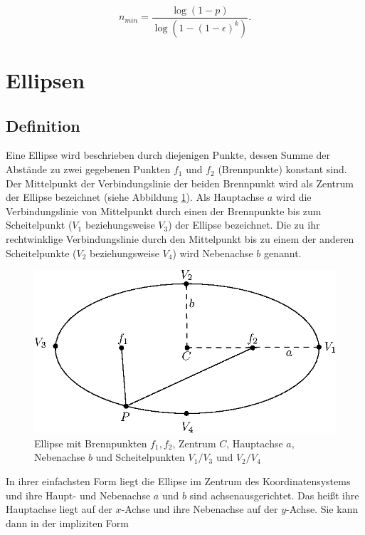 \begin{equation}
n_{min} = \frac{\log{\left(1-p\right)}}{\log{\left(1-\left(1-\epsilon\right)^k\right)}}.
\end{equation}


\section{Ellipsen}
\label{s:ellipse}
\subsection{Definition}
\label{s:ellipseGeneral}

\begin{definition}[Ellipse]
	Eine Ellipse wird beschrieben durch diejenigen Punkte, dessen Summe der Abstände zu zwei gegebenen Punkten $f_1$ und $f_2$ (Brennpunkte) konstant sind. Der Mittelpunkt der Verbindungslinie der beiden Brennpunkt wird als Zentrum der Ellipse bezeichnet (siehe Abbildung \ref{fig:ellipseDef}).
	Als Hauptachse $a$ wird die Verbindungslinie von Mittelpunkt durch einen der Brennpunkte bis zum Scheitelpunkt ($V_1$ beziehungsweise $V_3$) der Ellipse bezeichnet. Die zu ihr rechtwinklige Verbindungslinie durch den Mittelpunkt bis zu einem der anderen Scheitelpunkte ($V_2$ beziehungsweise $V_4$) wird Nebenachse $b$ genannt.
\end{definition}

\begin{figure}[!htb]
	\centering
	\includegraphics[scale=.9]{images/ellipse_focalDef.eps}
	\caption{Ellipse mit Brennpunkten $f_1, f_2$, Zentrum $C$, Hauptachse $a$, Nebenachse $b$ und Scheitelpunkten $V_1/V_3$ und $V_2/V_4$}
	\label{fig:ellipseDef}
\end{figure}

In ihrer einfachsten Form liegt die Ellipse im Zentrum des Koordinatensystems und ihre Haupt- und Nebenachse $a$ und $b$ sind achsenausgerichtet. Das heißt ihre Hauptachse liegt auf der $x$-Achse und ihre Nebenachse auf der $y$-Achse. Sie kann dann in der impliziten Form

